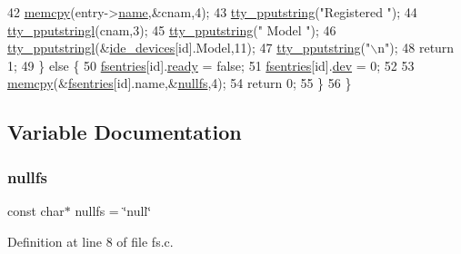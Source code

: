 \begin{DoxyCode}
42         \hyperlink{a00110_a370712322c794e949c996946f2283ea8_a370712322c794e949c996946f2283ea8}{memcpy}(entry->\hyperlink{a00226_a9c5a4f5b02eb2c9e9e797f79dc99028a_a9c5a4f5b02eb2c9e9e797f79dc99028a}{name},&cnam,4);
43         \hyperlink{a00140_ade960b1320324706aac6c00cc6b1b2fe_ade960b1320324706aac6c00cc6b1b2fe}{tty\_pputstring}(\textcolor{stringliteral}{"Registered "});
44         \hyperlink{a00140_abaf93f9e56ddb7b10462070f59e534e4_abaf93f9e56ddb7b10462070f59e534e4}{tty\_pputstringl}(cnam,3);
45         \hyperlink{a00140_ade960b1320324706aac6c00cc6b1b2fe_ade960b1320324706aac6c00cc6b1b2fe}{tty\_pputstring}(\textcolor{stringliteral}{" Model "});
46         \hyperlink{a00140_abaf93f9e56ddb7b10462070f59e534e4_abaf93f9e56ddb7b10462070f59e534e4}{tty\_pputstringl}(&\hyperlink{a00026_ab97a828ed4839b575dc382e2bf826e87_ab97a828ed4839b575dc382e2bf826e87}{ide\_devices}[\textcolor{keywordtype}{id}].Model,11);
47         \hyperlink{a00140_ade960b1320324706aac6c00cc6b1b2fe_ade960b1320324706aac6c00cc6b1b2fe}{tty\_pputstring}(\textcolor{stringliteral}{"\(\backslash\)n"});
48         \textcolor{keywordflow}{return} 1;
49     \} \textcolor{keywordflow}{else} \{
50         \hyperlink{a00128_a6b46131164b26e476762930c9aae4319_a6b46131164b26e476762930c9aae4319}{fsentries}[id].\hyperlink{a00226_a284522ed97fe1eeebd0fcc039b2ea00a_a284522ed97fe1eeebd0fcc039b2ea00a}{ready} = \textcolor{keyword}{false};
51         \hyperlink{a00128_a6b46131164b26e476762930c9aae4319_a6b46131164b26e476762930c9aae4319}{fsentries}[id].\hyperlink{a00226_aaea66ea744fa50f1c54666033884d8d2_aaea66ea744fa50f1c54666033884d8d2}{dev} = 0;
52 
53         \hyperlink{a00110_a370712322c794e949c996946f2283ea8_a370712322c794e949c996946f2283ea8}{memcpy}(&\hyperlink{a00128_a6b46131164b26e476762930c9aae4319_a6b46131164b26e476762930c9aae4319}{fsentries}[\textcolor{keywordtype}{id}].name,&\hyperlink{a00125_a36265ac74fd925405e1179e799961f1e_a36265ac74fd925405e1179e799961f1e}{nullfs},4);
54         \textcolor{keywordflow}{return} 0;
55     \} 
56 \}
\end{DoxyCode}


\subsection{Variable Documentation}
\mbox{\label{a00125_a36265ac74fd925405e1179e799961f1e_a36265ac74fd925405e1179e799961f1e}} 
\subsubsection{\texorpdfstring{nullfs}{nullfs}}
{\footnotesize\ttfamily const char$\ast$ nullfs = \char`\"{}null\char`\"{}}



Definition at line 8 of file fs.\+c.

